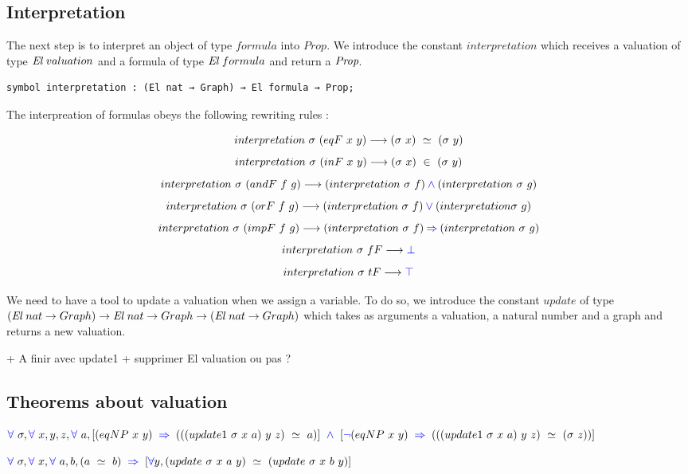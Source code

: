 \documentclass[a4paper]{article}
\begin{document}
\subsection{Interpretation}

The next step is to interpret an object of type $formula$ into $Prop$. We introduce the constant $interpretation$ which receives a valuation of type $\El \ valuation$ and a formula of type $\El \ formula$ and return a ${\mbox{\it Prop}}$.

\begin{lstlisting}
symbol interpretation : (El nat → Graph) → El formula → Prop;
\end{lstlisting}

The interpreation of formulas obeys the following rewriting rules :

$$interpretation \ \sigma \ (eqF \ x \ y) \longrightarrow (\sigma \ x) \ \simeq \ (\sigma \ y)$$
$$interpretation \ \sigma \ (inF \ x \ y) \longrightarrow (\sigma \ x) \ \in \ (\sigma \ y)$$
$$interpretation \ \sigma \ (andF \ f \ g) \lra (interpretation \ \sigma \ f) \conj (interpretation \ \sigma \ g)$$
$$interpretation \ \sigma \ (orF \ f \ g) \longrightarrow (interpretation \ \sigma \ f) \mathbin{\color{blue} \vee}  (interpretation \sigma \ g)$$
$$interpretation \ \sigma \ (impF \ f \ g) \lra (interpretation \ \sigma \ f) \imp (interpretation \ \sigma \ g)$$
$$interpretation \ \sigma \ fF \longrightarrow {\color{blue} \bot}$$
$$interpretation \ \sigma \ tF \longrightarrow {\color{blue} \top}$$

We need to have a tool to update a valuation when we assign a variable. To do so, we introduce the constant $update$ of type $({\mbox{\it El}} \ nat \rightarrow Graph) \rightarrow {\mbox{\it El}} \ nat \rightarrow Graph \rightarrow ({\mbox{\it El}} \ nat \rightarrow Graph)$ which takes as arguments a valuation, a natural number and a graph and returns a new valuation. 

+ A finir avec update1
+ supprimer El valuation ou pas ?

\subsection{Theorems about valuation}

\begin{theorem}
$\fa \ \sigma, \fa \ x, y, z, \fa \ a, [(eqNP \ x \ y) \ \imp \ (((update1 \ \sigma \ x \ a) \ y \ z) \ \simeq \ a)] \ \conj \ [\blneg(eqNP \ x \ y) \ \imp \ (((update1 \ \sigma \ x \ a) \ y \ z) \ \simeq \ (\sigma \ z))]$
\end{theorem}

\begin{theorem}
$\fa \ \sigma, \fa \ x, \fa \ a, b, (a \ \simeq \ b) \ \imp \ [\fa y, (update \ \sigma \ x \ a \ y) \ \simeq \ (update \ \sigma \ x \ b \ y)]$
\end{theorem}
\end{document}
